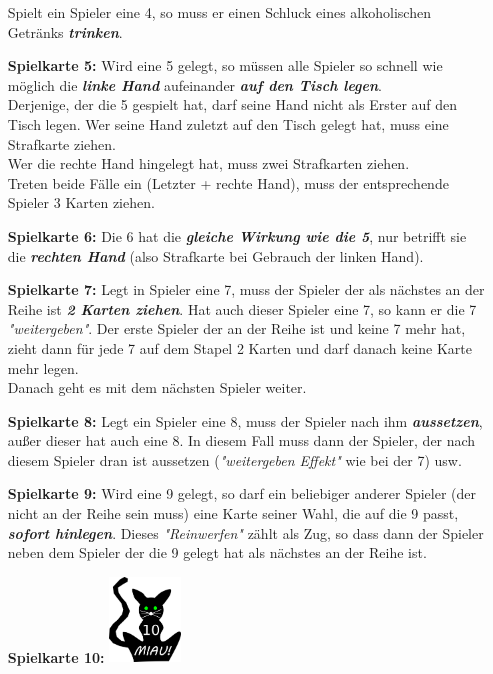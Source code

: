 \documentclass{article}
\begin{document}
\begin{itemize}
Spielt ein Spieler eine 4, so muss er einen Schluck eines alkoholischen Getränks \textit{\textbf{trinken}}.
\item[\textbf{Spielkarte 5:}]
Wird eine 5 gelegt, so müssen alle Spieler so schnell wie möglich die \textit{\textbf{linke Hand}} aufeinander \textit{\textbf{auf den Tisch legen}}. \\
Derjenige, der die 5 gespielt hat, darf seine Hand nicht als Erster auf den Tisch legen. Wer seine Hand zuletzt auf den Tisch gelegt hat, muss eine Strafkarte ziehen. \\
Wer die rechte Hand hingelegt hat, muss zwei Strafkarten ziehen.\\ Treten beide Fälle ein (Letzter + rechte Hand), muss der entsprechende Spieler 3 Karten ziehen.
\item[\textbf{Spielkarte 6:}]
Die 6 hat die \textit{\textbf{gleiche Wirkung wie die 5}}, nur betrifft sie die \textit{\textbf{rechten Hand}} (also Strafkarte bei Gebrauch der linken Hand).
\item[\textbf{Spielkarte 7:}] 
Legt in Spieler eine 7, muss der Spieler der als nächstes an der Reihe ist \textit{\textbf{2 Karten ziehen}}. Hat auch dieser Spieler eine 7, so kann er die 7 \textit{"weitergeben"}. Der erste Spieler der an der Reihe ist und keine 7 mehr hat, zieht dann für jede 7 auf dem Stapel 2 Karten und darf danach keine Karte mehr legen. \\
Danach geht es mit dem nächsten Spieler weiter.
\item[\textbf{Spielkarte 8:}]
Legt ein Spieler eine 8, muss der Spieler nach ihm \textit{\textbf{aussetzen}}, außer dieser hat auch eine 8. In diesem Fall muss dann der Spieler, der nach diesem Spieler dran ist aussetzen (\textit{"weitergeben
Effekt"} wie bei der 7) usw.
\item[\textbf{Spielkarte 9:}]
Wird eine 9 gelegt, so darf ein beliebiger anderer Spieler (der nicht an der Reihe sein muss) eine Karte seiner Wahl, die auf die 9 passt, \textit{\textbf{sofort hinlegen}}. Dieses
\textit{"Reinwerfen"} zählt als Zug, so dass dann der Spieler neben dem Spieler der die 9 gelegt hat als nächstes an der Reihe ist.
\item[\textbf{Spielkarte 10:}]
\includegraphics[width=0.15\textwidth]{photos/cat.png}

\end{itemize}
\end{document}
